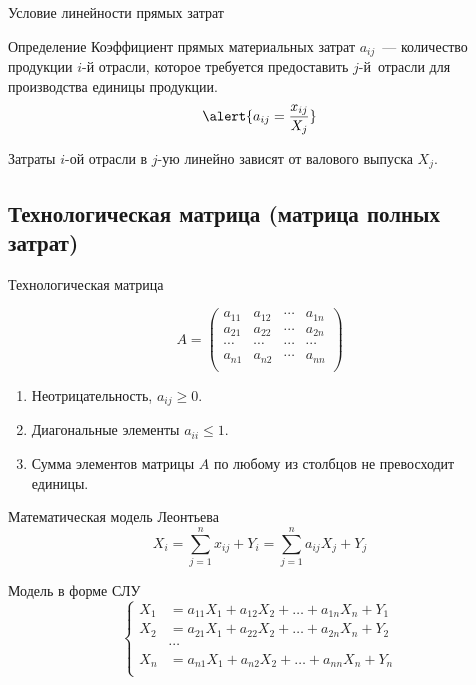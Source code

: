 \documentclass[unicode,11pt,notheorems,xcolor=table]{beamer}
\begin{document}
	\begin{frame}{Условие линейности прямых затрат}
	\begin{block}{Определение}
		\alert{Коэффициент прямых материальных затрат $a_{ij}$}~---  количество продукции $i$-й отрасли, которое требуется  предоставить $j$-й~отрасли для производства единицы продукции. 
		$$
			\alert{a_{ij}= \frac{x_{ij}}{X_j}}
		$$
	\end{block}

	Затраты $i$-ой отрасли в $j$-ую линейно зависят от валового выпуска $X_j$. 
	
\end{frame}

\subsection{Технологическая матрица (матрица полных затрат)}

\begin{frame}{Технологическая матрица}

	\begin{block}{}
		$$
		A= \begin{pmatrix}
			a_{11} & a_{12} &\cdots & a_{1n}\\
			a_{21} & a_{22} &\cdots & a_{2n}\\
			\cdots & \cdots & \cdots & \cdots\\
			a_{n1} & a_{n2} &\cdots & a_{nn}\\
		\end{pmatrix}
		$$
	\end{block}
	\begin{enumerate}
		\item Неотрицательность, $a_{ij}\geqslant 0$. 
		\item Диагональные элементы $a_{ii}\leqslant 1$. 
		\item Сумма элементов матрицы $A$ по любому из столбцов не превосходит 
		единицы.
	\end{enumerate}
\end{frame}


\begin{frame}{Математическая модель Леонтьева}
	$$
		X_i = \sum_{j=1}^n x_{ij} +Y_i = \sum_{j=1}^n a_{ij}X_j + Y_j
	$$
	
	\bigskip
	\begin{block}{Модель в форме СЛУ}
	$$
		\left\lbrace
		\begin{aligned}
			X_1 &= a_{11}X_1 +  a_{12} X_2  + \ldots + a_{1n}X_n  + Y_1\\
			X_2 &= a_{21}X_1 +  a_{22} X_2  + \ldots + a_{2n}X_n  + Y_2\\
			&\cdots\\
			X_n &= a_{n1}X_1 +  a_{n2} X_2  + \ldots + a_{nn}X_n  + Y_n\\
		\end{aligned}
		\right.
	$$
	\end{block}
\end{frame}
\end{document}
